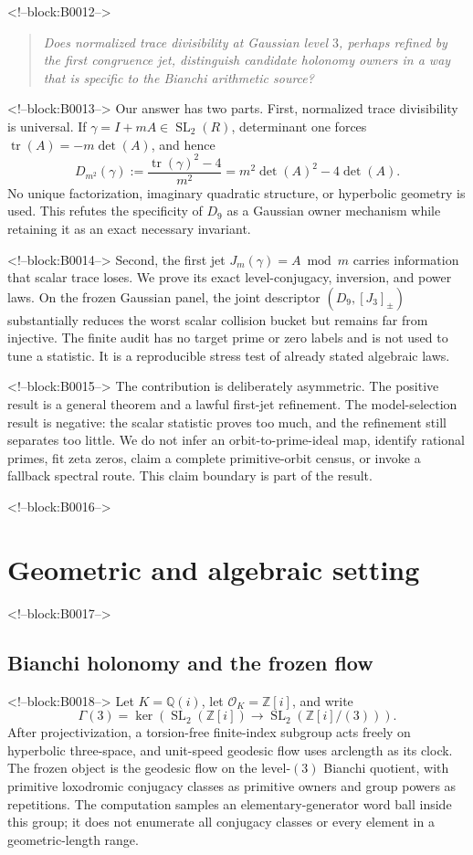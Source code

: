 \documentclass[11pt,a4paper]{article}
\theoremstyle{definition}
\theoremstyle{remark}
\newcommand{\SL}{\operatorname{SL}}
\newcommand{\tr}{\operatorname{tr}}
\newcommand{\Gauss}{\mathbb{Z}[i]}
\begin{document}
<!--block:B0012-->
\begin{quote}
\emph{Does normalized trace divisibility at Gaussian level \(3\), perhaps refined by the first congruence jet, distinguish candidate holonomy owners in a way that is specific to the Bianchi arithmetic source?}
\end{quote}

<!--block:B0013-->
Our answer has two parts. First, normalized trace divisibility is universal. If \(\gamma=I+mA\in\SL_2(R)\), determinant one forces \(\tr(A)=-m\det(A)\), and hence
\[
 D_{m^2}(\gamma):=\frac{\tr(\gamma)^2-4}{m^2}
 =m^2\det(A)^2-4\det(A).
\]
No unique factorization, imaginary quadratic structure, or hyperbolic geometry is used. This refutes the specificity of \(D_9\) as a Gaussian owner mechanism while retaining it as an exact necessary invariant.

<!--block:B0014-->
Second, the first jet \(J_m(\gamma)=A\bmod m\) carries information that scalar trace loses. We prove its exact level-conjugacy, inversion, and power laws. On the frozen Gaussian panel, the joint descriptor \((D_9,[J_3]_{\pm})\) substantially reduces the worst scalar collision bucket but remains far from injective. The finite audit has no target prime or zero labels and is not used to tune a statistic. It is a reproducible stress test of already stated algebraic laws.

<!--block:B0015-->
The contribution is deliberately asymmetric. The positive result is a general theorem and a lawful first-jet refinement. The model-selection result is negative: the scalar statistic proves too much, and the refinement still separates too little. We do not infer an orbit-to-prime-ideal map, identify rational primes, fit zeta zeros, claim a complete primitive-orbit census, or invoke a fallback spectral route. This claim boundary is part of the result.

<!--block:B0016-->
\section{Geometric and algebraic setting}

<!--block:B0017-->
\subsection{Bianchi holonomy and the frozen flow}

<!--block:B0018-->
Let \(K=\mathbb{Q}(i)\), let \(\mathcal O_K=\Gauss\), and write
\[
 \Gamma(3)=\ker\!\left(\SL_2(\Gauss)\longrightarrow\SL_2(\Gauss/(3))\right).
\]
After projectivization, a torsion-free finite-index subgroup acts freely on hyperbolic three-space, and unit-speed geodesic flow uses arclength as its clock. The frozen object is the geodesic flow on the level-\((3)\) Bianchi quotient, with primitive loxodromic conjugacy classes as primitive owners and group powers as repetitions. The computation samples an elementary-generator word ball inside this group; it does not enumerate all conjugacy classes or every element in a geometric-length range.
\end{document}
